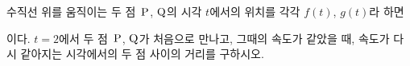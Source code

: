 수직선 위를 움직이는 두 점~$\mathrm{P}$, $\mathrm{Q}$의 시각 $t$에서의 위치를 각각 $f(t)$, $g(t)$라 하면\par\smallskip{}\par\smallskip\noindent 이다. $t=2$에서 두 점~$\mathrm{P}$, $\mathrm{Q}$가 처음으로 만나고, 그때의 속도가 같았을 때, 속도가 다시 같아지는 시각에서의 두 점 사이의 거리를 구하시오. 
